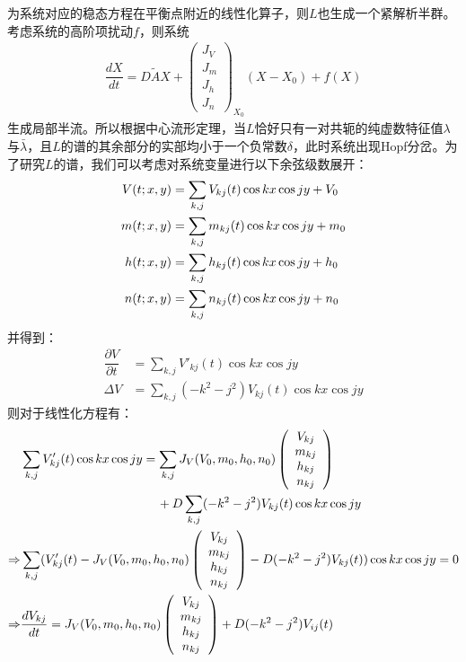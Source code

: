 \documentclass[
    bachelor,
    nofont, %
    pdflinks,
    ]{xjtuthesis}
\begin{document}
为系统对应的稳态方程在平衡点附近的线性化算子，则$L$也生成一个紧解析半群。考虑系统的高阶项扰动$f$，则系统
\begin{align}
\dfrac{d X}{dt}=D\tilde{A}X + \left(
\begin{array}{c}
J_V\\
J_m\\
J_h\\
J_n
\end{array}
\right)_{X_0} (X - X _0) +f(X)
\end{align}
生成局部半流。所以根据中心流形定理，当$L$恰好只有一对共轭的纯虚数特征值$\lambda$与$\bar{\lambda}$，且$L$的谱的其余部分的实部均小于一个负常数$\delta$，此时系统出现Hopf分岔。为了研究$L$的谱，我们可以考虑对系统变量进行以下余弦级数展开：
\begin{align}
\notag V(t;x,y)& =\sum_{k,j} V_{kj}(t)\cos kx \cos jy + V_0\\
m(t;x,y)& =\sum_{k,j} m_{kj}(t)\cos kx \cos jy +m_0\\
\notag h(t;x,y)& =\sum_{k,j} h_{kj}(t)\cos kx \cos jy +h_0\\
\notag n(t;x,y)& =\sum_{k,j} n_{kj}(t)\cos kx \cos jy +n_0
\end{align}
并得到：
\begin{align}
\dfrac{\partial V}{\partial t} &= \sum_{k,j} V'_{kj}(t)\cos kx \cos jy  \\
\Delta V &=  \sum_{k,j} (-k^2-j^2) V_{kj}(t)\cos kx \cos jy 
\end{align}
则对于线性化方程有：
\begin{align}
\notag  &\sum_{k,j} V'_{kj}(t)\cos kx \cos jy =  \sum_{k,j} J_{V}(V_0,m_0,h_0,n_0)
\left(
\begin{array}{c}
V_{kj}\\
m_{kj}\\
h_{kj}\\
n_{kj}
\end{array}
\right)\\
& \quad \quad \quad \quad \quad \quad \quad \quad \quad \quad \quad +D\sum_{k,j} (-k^2-j^2) V_{kj}(t)\cos kx \cos jy\\
\notag \Rightarrow & \sum_{k,j} (V'_{kj}(t)-J_{V}(V_0,m_0,h_0,n_0)
\left(
\begin{array}{c}
V_{kj}\\
m_{kj}\\
h_{kj}\\
n_{kj}
\end{array}
\right) -D(-k^2-j^2) V_{kj}(t))\cos kx \cos jy=0 \\
\Rightarrow & \dfrac{d V_{kj}}{d t}= J_{V}(V_0,m_0,h_0,n_0)
\left(
\begin{array}{c}
V_{kj}\\
m_{kj}\\
h_{kj}\\
n_{kj}
\end{array}
\right)+D(-k^2-j^2)V_{ij}(t)
\end{align}
\end{document}
